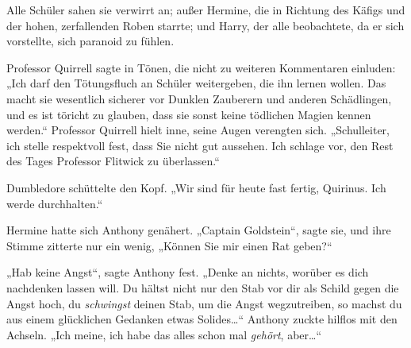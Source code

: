 Alle Schüler sahen sie verwirrt an; außer Hermine, die in Richtung des Käfigs und der hohen, zerfallenden Roben starrte; und Harry, der alle beobachtete, da er sich vorstellte, sich paranoid zu fühlen.

Professor Quirrell sagte in Tönen, die nicht zu weiteren Kommentaren einluden: „Ich darf den Tötungsfluch an Schüler weitergeben, die ihn lernen wollen. Das macht sie wesentlich sicherer vor Dunklen Zauberern und anderen Schädlingen, und es ist töricht zu glauben, dass sie sonst keine tödlichen Magien kennen werden.“ Professor Quirrell hielt inne, seine Augen verengten sich. „Schulleiter, ich stelle respektvoll fest, dass Sie nicht gut aussehen. Ich schlage vor, den Rest des Tages Professor Flitwick zu überlassen.“

Dumbledore schüttelte den Kopf. „Wir sind für heute fast fertig, Quirinus. Ich werde durchhalten.“

Hermine hatte sich Anthony genähert. „Captain Goldstein“, sagte sie, und ihre Stimme zitterte nur ein wenig, „Können Sie mir einen Rat geben?“

„Hab keine Angst“, sagte Anthony fest. „Denke an nichts, worüber es dich nachdenken lassen will. Du hältst nicht nur den Stab vor dir als Schild gegen die Angst hoch, du \emph{schwingst} deinen Stab, um die Angst wegzutreiben, so machst du aus einem glücklichen Gedanken etwas Solides…“ Anthony zuckte hilflos mit den Achseln. „Ich meine, ich habe das alles schon mal \emph{gehört}, aber…“

